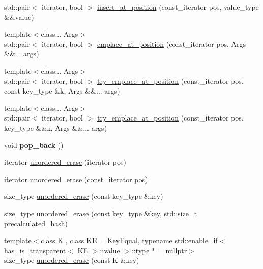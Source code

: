 \begin{DoxyCompactItemize}
std\+::pair$<$ iterator, bool $>$ \mbox{\hyperlink{classtsl_1_1ordered__map_a9e0dd9d497c03c763f2b5776d35f9f9f}{insert\+\_\+at\+\_\+position}} (const\+\_\+iterator pos, value\+\_\+type \&\&value)
\item 
{\footnotesize template$<$class... Args$>$ }\\std\+::pair$<$ iterator, bool $>$ \mbox{\hyperlink{classtsl_1_1ordered__map_aef1892adae2cbc052239c3580ba004c5}{emplace\+\_\+at\+\_\+position}} (const\+\_\+iterator pos, Args \&\&... args)
\item 
{\footnotesize template$<$class... Args$>$ }\\std\+::pair$<$ iterator, bool $>$ \mbox{\hyperlink{classtsl_1_1ordered__map_a73b41d7b710c3986cdf34a21863dbfb2}{try\+\_\+emplace\+\_\+at\+\_\+position}} (const\+\_\+iterator pos, const key\+\_\+type \&k, Args \&\&... args)
\item 
{\footnotesize template$<$class... Args$>$ }\\std\+::pair$<$ iterator, bool $>$ \mbox{\hyperlink{classtsl_1_1ordered__map_a21068919c8666ee5c4e5b1f0d199b63c}{try\+\_\+emplace\+\_\+at\+\_\+position}} (const\+\_\+iterator pos, key\+\_\+type \&\&k, Args \&\&... args)
\item 
\mbox{\label{classtsl_1_1ordered__map_ad7af97045dc7f44709fc1fb696774705}} 
void {\bfseries pop\+\_\+back} ()
\item 
iterator \mbox{\hyperlink{classtsl_1_1ordered__map_a53ec4038c6c279995e3ce96414b959a8}{unordered\+\_\+erase}} (iterator pos)
\item 
iterator \mbox{\hyperlink{classtsl_1_1ordered__map_a9c6f37116d357f665108c43c67b4d0df}{unordered\+\_\+erase}} (const\+\_\+iterator pos)
\item 
size\+\_\+type \mbox{\hyperlink{classtsl_1_1ordered__map_a1f070a35cdd7c62946f24d2fc122db35}{unordered\+\_\+erase}} (const key\+\_\+type \&key)
\item 
size\+\_\+type \mbox{\hyperlink{classtsl_1_1ordered__map_a482e931c4125adb155005ee38b0ceda4}{unordered\+\_\+erase}} (const key\+\_\+type \&key, std\+::size\+\_\+t precalculated\+\_\+hash)
\item 
{\footnotesize template$<$class K , class KE  = Key\+Equal, typename std\+::enable\+\_\+if$<$ has\+\_\+is\+\_\+transparent$<$ K\+E $>$\+::value $>$\+::type $\ast$  = nullptr$>$ }\\size\+\_\+type \mbox{\hyperlink{classtsl_1_1ordered__map_aac95431ce5de6d457355292a8230eb98}{unordered\+\_\+erase}} (const K \&key)

\end{DoxyCompactItemize}
